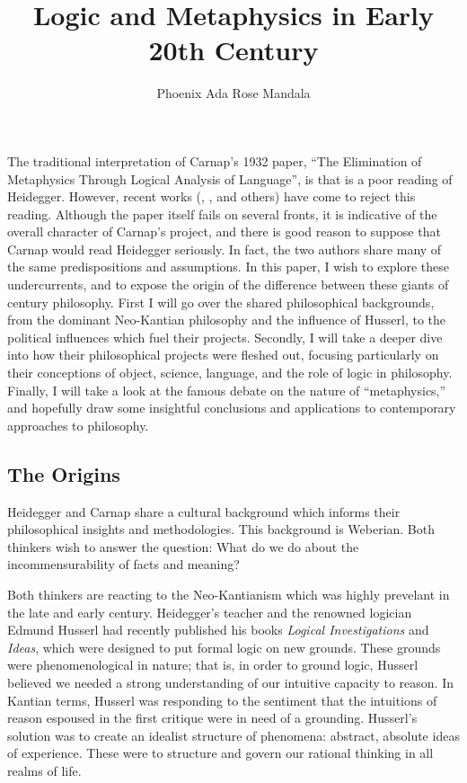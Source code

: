 \documentclass[leqno, 12pt]{turabian-researchpaper}
\title{Logic and Metaphysics in Early 20th Century}
\author{Phoenix Ada Rose Mandala}
\begin{document}
	\maketitle

	The traditional interpretation of Carnap's 1932 paper, \enquote{The Elimination of Metaphysics Through Logical Analysis of Language},
	\nocite{carnap1966} is that is a poor reading of Heidegger. \nocite{heidegger2008}
	However, recent works (\cite{dambock2022}, \cite{stone2017}, and others) have come
	to reject this reading. Although the paper itself fails on several fronts, it is
	indicative of the overall character of Carnap's project, and there is good
	reason to suppose that Carnap would read Heidegger seriously. In fact, the two
	authors share many of the same predispositions and assumptions. In this paper,
	I wish to explore these undercurrents, and to expose the origin of the difference
	between these giants of  century philosophy. First I will go over the shared
	philosophical backgrounds, from the dominant Neo-Kantian philosophy and the
	influence of Husserl, to the political influences which fuel their projects.
	Secondly, I will take a deeper dive into how their philosophical projects were
	fleshed out, focusing particularly on their conceptions of object, science,
	language, and the role of logic in philosophy. Finally, I will take a look at the
	famous debate on the nature of \enquote{metaphysics,} and hopefully draw some
	insightful conclusions and applications to contemporary approaches to
	philosophy.

	\subsection{The Origins}

	Heidegger and Carnap share a cultural background which informs their philosophical
	insights and methodologies. This background is Weberian. Both thinkers wish to
	answer the question: What do we do about the incommensurability of facts and
	meaning?

	Both thinkers are reacting to the Neo-Kantianism which was highly prevelant in
	the late  and early  century. Heidegger's teacher and the renowned
	logician Edmund Husserl had recently published his books \textit{Logical
	Investigations} \nocite{husserl2005} and \textit{Ideas}, which were designed to
	put formal logic on new grounds. These grounds were phenomenological in nature;
	that is, in order to ground logic, Husserl believed we needed a strong understanding
	of our intuitive capacity to reason. In Kantian terms, Husserl was responding to
	the sentiment that the intuitions of reason espoused in the first critique were
	in need of a grounding. Husserl's solution was to create an idealist structure
	of phenomena: abstract, absolute ideas of experience. These were to structure and
	govern our rational thinking in all realms of life.
\end{document}
